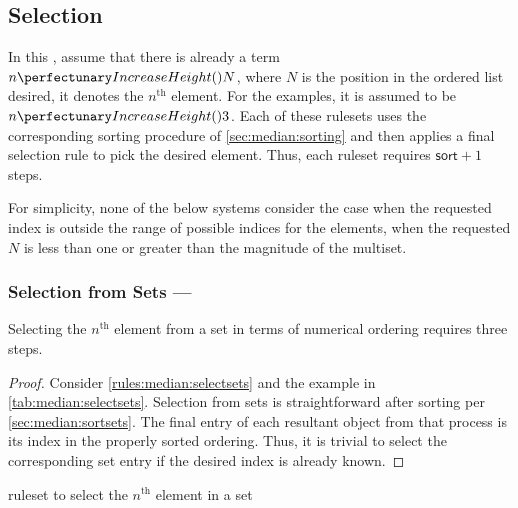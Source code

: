 \subsection{Selection}\label{sec:median:selection}

In this , assume that there is already a term \(\cpfunc{n}{N}\), where \(N\) is the position in the ordered list desired, \ie{} it denotes the \(n^{\text{th}}\) element.  For the examples, it is assumed to be \(\cpfunc{n}{3}\).  Each of these \glspl{ruleset} uses the corresponding sorting procedure of \cref{sec:median:sorting} and then applies a final selection rule to pick the desired element.  Thus, each \gls{ruleset} requires \(\textsf{sort} + 1\) steps.

For simplicity, none of the below systems consider the case when the requested index is outside the range of possible indices for the elements, \ie{} when the requested \(N\) is less than one or greater than the magnitude of the multiset.

\subsubsection{Selection from Sets --- }\label{sec:median:selectsets}

\begin{proposition}\label{prop:median:selectsets}
Selecting the \(n^{\text{th}}\) element from a set in terms of numerical ordering requires three steps.
\end{proposition}

\begin{proof}
Consider \cref{rules:median:selectsets} and the example in \cref{tab:median:selectsets}.  Selection from sets is straightforward after sorting per \cref{sec:median:sortsets}.  The final entry of each resultant object from that process is its index in the properly sorted ordering.  Thus, it is trivial to select the corresponding set entry if the desired index is already known.
\end{proof}

\begin{cprulesetfloat}
\begin{cpruleset}


\end{cpruleset}
\caption{\label{rules:median:selectsets}\Gls{ruleset} to select the \(n^{\text{th}}\) element in a set}
\end{cprulesetfloat}

